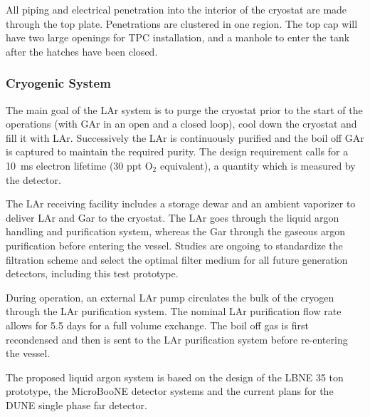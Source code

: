 All piping and electrical penetration into the interior of the cryostat are made through the top plate.
Penetrations are clustered in one region. 
The top cap will have two large openings for TPC installation, and a manhole to enter the tank  after the 
hatches have been closed.

\subsubsection{Cryogenic System}

The main goal of the LAr system is to purge the cryostat prior to the start of the operations (with GAr in an open 
and a closed loop), cool down the cryostat and fill it with LAr. Successively the LAr is continuously purified 
and the boil off GAr is captured  to maintain the required purity. The design requirement calls for a 10~ms electron lifetime (30 ppt O$_2$ equivalent), a quantity  which is measured by the detector.

The LAr receiving facility includes a storage dewar and an ambient vaporizer to deliver LAr and Gar to the 
cryostat. The LAr goes through the liquid argon handling and purification system, whereas the Gar 
through the gaseous argon purification before entering the vessel.
Studies are ongoing to standardize the filtration scheme and select the optimal filter medium for all 
future generation detectors, including this test prototype. 

During operation, an external LAr pump circulates the bulk of the cryogen through the LAr purification 
system. The nominal LAr purification flow rate allows for 5.5 days for a full volume exchange.
The boil off gas is first recondensed and then is sent to the LAr purification system before
re-entering the vessel.

The proposed liquid argon system is based on the design of the 
LBNE 35 ton prototype, the MicroBooNE detector systems and the current plans for the DUNE single phase far 
detector.








    
    
